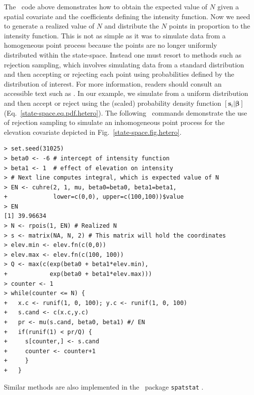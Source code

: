The \R~code above demonstrates how to obtain the expected value
of $N$ given a spatial covariate and the coefficients defining the
intensity function. Now we need to generate a realized value of $N$
and distribute the $N$ points in proportion to the intensity
function. This is not as simple as it was to simulate data from a homogeneous point process
because the points are no longer uniformly distributed within the
state-space. Instead one must resort to methods such as rejection sampling, which involves
simulating data from a standard distribution and then accepting or
rejecting each point using probabilities defined by the distribution
of interest. For more information, readers should consult an
accessible text such as \citet{robert_casella:2010}. In our example, we
simulate from a uniform distribution and then accept or reject using
the (scaled) probability density function
$[\mathbf{s}_i | \bm{\beta}]$
(Eq.~\ref{state-space.eq.pdf.hetero}). The following \R~commands
demonstrate the use of
rejection sampling to simulate an inhomogeneous point process for the
elevation covariate depicted in
Fig.~\ref{state-space.fig.hetero}.
  \begin{small}
\begin{verbatim}
> set.seed(31025)
> beta0 <- -6 # intercept of intensity function
> beta1 <- 1  # effect of elevation on intensity
> # Next line computes integral, which is expected value of N
> EN <- cuhre(2, 1, mu, beta0=beta0, beta1=beta1,
+             lower=c(0,0), upper=c(100,100))$value
> EN
[1] 39.96634
> N <- rpois(1, EN) # Realized N
> s <- matrix(NA, N, 2) # This matrix will hold the coordinates
> elev.min <- elev.fn(c(0,0))
> elev.max <- elev.fn(c(100, 100))
> Q <- max(c(exp(beta0 + beta1*elev.min),
+            exp(beta0 + beta1*elev.max)))
> counter <- 1
> while(counter <= N) {
+   x.c <- runif(1, 0, 100); y.c <- runif(1, 0, 100)
+   s.cand <- c(x.c,y.c)
+   pr <- mu(s.cand, beta0, beta1) #/ EN
+   if(runif(1) < pr/Q) {
+     s[counter,] <- s.cand
+     counter <- counter+1
+     }
+   }
\end{verbatim}
  \end{small}
Similar methods are also
implemented in the \R~package \texttt{spatstat} \citep{baddeley_turner:2005}.
